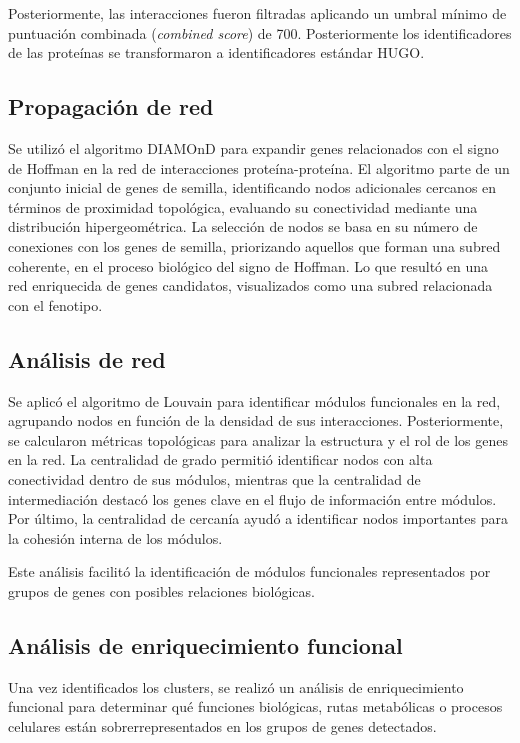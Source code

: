Posteriormente, las interacciones fueron filtradas aplicando un umbral mínimo de puntuación combinada (\textit{combined score}) de 700. Posteriormente los identificadores de las proteínas se transformaron a identificadores estándar HUGO.

\subsection{Propagación de red}

Se utilizó el algoritmo DIAMOnD para expandir genes relacionados con el signo de Hoffman en la red de interacciones proteína-proteína. El algoritmo parte de un conjunto inicial de genes de semilla, identificando nodos adicionales cercanos en términos de proximidad topológica, evaluando su conectividad mediante una distribución hipergeométrica. La selección de nodos se basa en su número de conexiones con los genes de semilla, priorizando aquellos que forman una subred coherente, en el proceso biológico del signo de Hoffman. Lo que resultó en una red enriquecida de genes candidatos, visualizados como una subred relacionada con el fenotipo.

\subsection{Análisis de red}
Se aplicó el algoritmo de Louvain para identificar módulos funcionales en la red, agrupando nodos en función de la densidad de sus interacciones. Posteriormente, se calcularon métricas topológicas para analizar la estructura y el rol de los genes en la red. La centralidad de grado permitió identificar nodos con alta conectividad dentro de sus módulos, mientras que la centralidad de intermediación destacó los genes clave en el flujo de información entre módulos. Por último, la centralidad de cercanía ayudó a identificar nodos importantes para la cohesión interna de los módulos.

Este análisis facilitó la identificación de módulos funcionales representados por grupos de genes con posibles relaciones biológicas.

\subsection{Análisis de enriquecimiento funcional}

Una vez identificados los clusters, se realizó un análisis de enriquecimiento funcional para determinar qué funciones biológicas, rutas metabólicas o procesos celulares están sobrerrepresentados en los grupos de genes detectados.